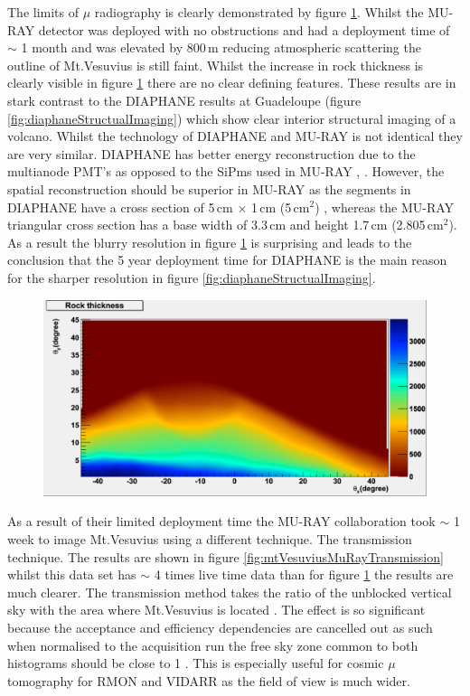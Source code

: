 The limits of $\mu$ radiography is clearly demonstrated by figure \ref{fig:mtVesuviusMuRayImaging}. Whilst the MU-RAY detector was deployed with no obstructions and had a deployment time of $\sim$ 1 month and was elevated by 800\,m reducing atmospheric scattering the outline of Mt.Vesuvius is still faint. Whilst the increase in rock thickness is clearly visible in figure \ref{fig:mtVesuviusMuRayImaging} there are no clear defining features. These results are in stark contrast to the DIAPHANE results at Guadeloupe (figure \ref{fig:diaphaneStructualImaging}) which show clear interior structural imaging of a volcano. Whilst the technology of DIAPHANE and MU-RAY is not identical they are very similar. DIAPHANE has better energy reconstruction due to the multianode PMT’s as opposed to the SiPms used in MU-RAY \cite{Marteau_2017}, \cite{ANASTASIO2013423}. However, the spatial reconstruction should be superior in MU-RAY as the segments in DIAPHANE have a cross section of 5\,cm $\times$ 1\,cm (5\,cm$^2$) \cite{MARTEAU201223}, whereas the MU-RAY triangular cross section has a base width of 3.3\,cm and height 1.7\,cm (2.805\,cm$^2$). As a result the blurry resolution in figure \ref{fig:mtVesuviusMuRayImaging} is surprising and leads to the conclusion that the 5 year deployment time for DIAPHANE is the main reason for the sharper resolution in figure \ref{fig:diaphaneStructualImaging}.

\begin{figure}[!h]
 \centering
 \includegraphics[width=0.7\linewidth]{Chapter5/Figs/Raster/mtVesuviusMuRayImaging.png}
 \label{fig:mtVesuviusMuRayImaging}
\end{figure}

As a result of their limited deployment time the MU-RAY collaboration took $\sim$ 1 week to image Mt.Vesuvius using a different technique. The transmission technique. The results are shown in figure \ref{fig:mtVesuviusMuRayTransmission} whilst this data set has $\sim$ 4 times live time data than for figure \ref{fig:mtVesuviusMuRayImaging} the results are much clearer. The transmission method takes the ratio of the unblocked vertical sky with the area where Mt.Vesuvius is located \cite{Ambrosino_2014}. The effect is so significant because the acceptance and efficiency dependencies are cancelled out as such when normalised to the acquisition run the free sky zone common to both histograms should be close to 1 \cite{Ambrosino_2014}. This is especially useful for cosmic $\mu$ tomography for RMON and VIDARR as the field of view is much wider.

